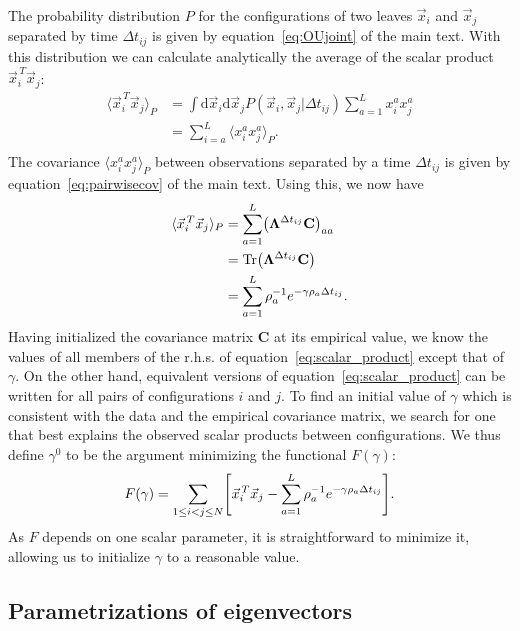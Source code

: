 \documentclass[preprint,amsmath,amssymb,superscriptaddress,showpacs,pre]{revtex4-1}
\let\originalleft\left
\let\originalright\right
\renewcommand{\left}{\mathopen{}\mathclose\bgroup\originalleft}
\renewcommand{\right}{\aftergroup\egroup\originalright}
\def\vx{\vec x}
\DeclareMathOperator{\Tr}{Tr}
\newcommand{\ddroit}{\textrm{d}}
\newcommand{\Lam}{\bm{\Lambda}}
\begin{document}
	The probability distribution $P$ for the configurations of two leaves $\vx_i$ and  $\vx_j$  separated by time $\Delta t_{ij}$ is given by equation~\eqref{eq:OUjoint} of the main text. 
	With this distribution we can calculate analytically the average of the scalar product $\vx_i^{\,T}\vx_j$:
	\begin{align*}
		\langle \vx_i^{\,T}\vx_j \rangle_P &= \int \ddroit \vx_i \ddroit \vx_j P(\vx_i,\vx_j|\Delta t_{ij}) \sum_{a=1}^L   x_i^{a}x_j^{a}  \\
		&=\sum_{i=a}^L \langle  x_i^{a} x_j^a \rangle_{P}.\\
	\end{align*}
	The covariance $\langle  x_i^{a} x_j^a \rangle_{P}$ between observations separated by a time $\Delta t_{ij}$ is given by equation~\eqref{eq:pairwisecov} of the main text.
	Using this, we now have
	\begin{align}
		\nonumber\langle \vx_i^{\,T}\vx_j \rangle_P &= \sum_{a=1}^L \left( \Lam^{\Delta t_{ij}} \mathbf{C} \right)_{aa}\\
		\nonumber&= \Tr\left( \Lam^{\Delta t_{ij}} \mathbf{C} \right)\\
		&= \sum_{a=1}^L \rho_a^{-1}e^{-\gamma\rho_a\Delta t_{ij}}.
		\label{eq:scalar_product}
	\end{align}
	Having initialized the covariance matrix $\mathbf{C}$ at its empirical value, we know the values of all members of the r.h.s. of equation~\eqref{eq:scalar_product} except that of $\gamma$. 
	On the other hand, equivalent versions of equation~\eqref{eq:scalar_product} can be written for all pairs of configurations $i$ and $j$. 
	To find an initial value of $\gamma$ which is consistent with the data and the empirical covariance matrix, we search for one that best explains the observed scalar products between configurations. 
	We thus define $\gamma^0$ to be the argument minimizing the functional $F(\gamma)$: 
	\begin{equation}
	 	F(\gamma) = \sum_{1\leq i<j\leq N}\left[ \vx_i^{\,T}\vx_j - \sum_{a=1}^L \rho_a^{-1}e^{-\gamma\rho_a\Delta t_{ij}} \right].
	\end{equation} 
	As $F$ depends on one scalar parameter, it is straightforward to minimize it, allowing us to initialize $\gamma$ to a reasonable value.




\subsection{Parametrizations of  eigenvectors } %
\label{sub:parametrizations_of_eigenvectors}
\end{document}
